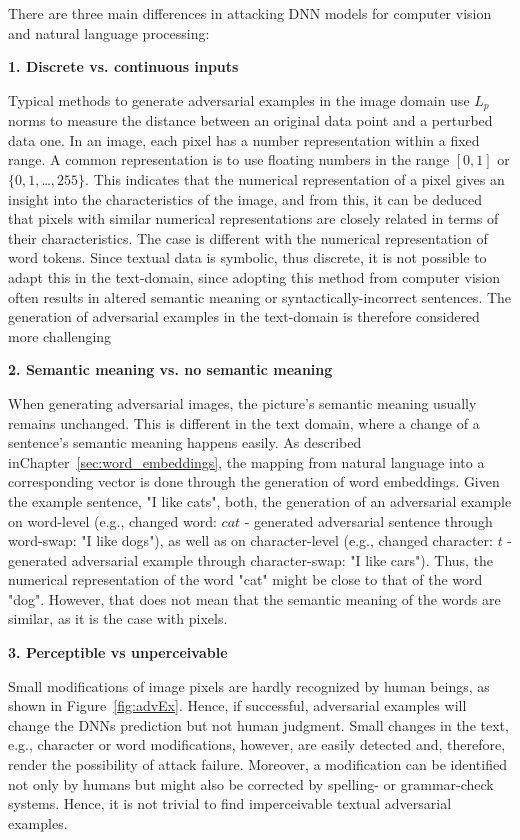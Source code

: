 There are three main differences in attacking DNN models for computer vision and natural language processing:

\textbf{1. Discrete vs. continuous inputs}

Typical methods to generate adversarial examples in the image domain use $L_p$ norms to measure the distance between an original data point and a perturbed data one. 
In an image, each pixel has a number representation within a fixed range. A common representation is to use floating numbers in the range ${[0,1]}$ or ${\{0,1,}$\dots${,255\}}$. This indicates that the numerical representation of a pixel gives an insight into the characteristics of the image, and from this, it can be deduced that pixels with similar numerical representations are closely related in terms of their characteristics. The case is different with the numerical representation of word tokens.
Since textual data is symbolic, thus discrete, it is not possible to adapt this in the text-domain, since adopting this method from computer vision often results in altered semantic meaning or syntactically-incorrect sentences. The generation of adversarial examples in the text-domain is therefore considered more challenging\cite{carlini2018audio} 

\textbf{2. Semantic meaning vs. no semantic meaning}

When generating adversarial images, the picture's semantic meaning usually remains unchanged. This is different in the text domain, where a change of a sentence's semantic meaning happens easily. As described inChapter~\ref{sec:word_embeddings}, the mapping from natural language into a corresponding vector is done through the generation of word embeddings.
Given the example sentence, "I like cats", both, the generation of an adversarial example on word-level (e.g., changed word: $cat$ - generated adversarial sentence through word-swap: "I like dogs"), as well as on character-level (e.g., changed character: $t$ - generated adversarial example through character-swap: "I like cars"). Thus, the numerical representation of the word "cat" might be close to that of the word "dog".
However, that does not mean that the semantic meaning of the words are similar, as it is the case with pixels.


\textbf{3. Perceptible vs unperceivable}

Small modifications of image pixels are hardly recognized by human beings, as shown in Figure~\ref{fig:advEx}. Hence, if successful, adversarial examples will change the DNNs prediction but not human judgment. Small changes in the text, e.g., character or word modifications, however, are easily detected and, therefore, render the possibility of attack failure. Moreover, a modification can be identified not only by humans but might also be corrected by spelling- or grammar-check systems. Hence, it is not trivial to find imperceivable textual adversarial examples.



